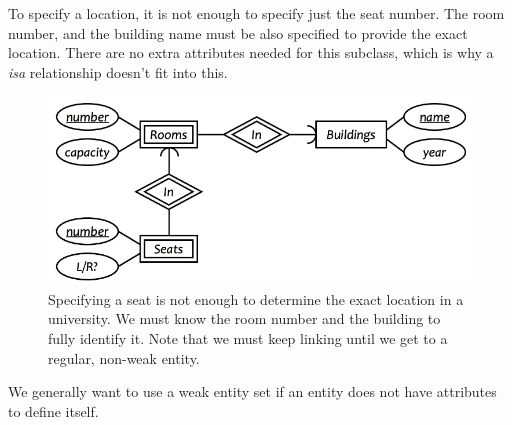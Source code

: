   \begin{example}
    To specify a location, it is not enough to specify just the seat number. The room number, and the building name must be also specified to provide the exact location. There are no extra attributes needed for this subclass, which is why a \textit{isa} relationship doesn't fit into this. 
    \begin{figure}[H]
      \centering 
      \includegraphics[scale=0.4]{img/weak_entity.png}
      \caption{Specifying a seat is not enough to determine the exact location in a university. We must know the room number and the building to fully identify it. Note that we must keep linking until we get to a regular, non-weak entity. } 
      \label{fig:weak_entity}
    \end{figure}
  \end{example}

  We generally want to use a weak entity set if an entity does not have attributes to define itself. 
  
